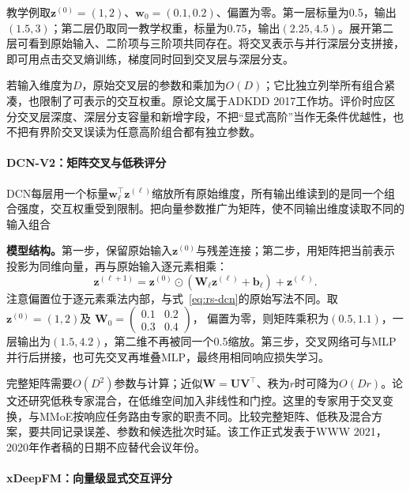 教学例取$\bm z^{(0)}=(1,2)$、$\bm w_0=(0.1,0.2)$、偏置为零。第一层标量为0.5，输出$(1.5,3)$；第二层仍取同一教学权重，标量为0.75，输出$(2.25,4.5)$。展开第二层可看到原始输入、二阶项与三阶项共同存在。将交叉表示与并行深层分支拼接，即可用点击交叉熵训练，梯度同时回到交叉层与深层分支。

若输入维度为$D$，原始交叉层的参数和乘加为$O(D)$；它比独立列举所有组合紧凑，也限制了可表示的交互权重。原论文属于ADKDD 2017工作坊。评价时应区分交叉层深度、深层分支容量和新增字段，不把“显式高阶”当作无条件优越性，也不把有界阶交叉误读为任意高阶组合都有独立参数。

\paragraph{DCN-V2：矩阵交叉与低秩评分}
\label{sec:rs-dcn-v2}

DCN每层用一个标量$\bm w_\ell^\top\bm z^{(\ell)}$缩放所有原始维度，所有输出维读到的是同一个组合强度，交互权重受到限制。把向量参数推广为矩阵，使不同输出维度读取不同的输入组合

\textbf{模型结构。}第一步，保留原始输入$\bm z^{(0)}$与残差连接；第二步，用矩阵把当前表示投影为同维向量，再与原始输入逐元素相乘：
\begin{equation}
 \bm z^{(\ell+1)}
 =\bm z^{(0)}\odot(\bm W_\ell\bm z^{(\ell)}+\bm b_\ell)
  +\bm z^{(\ell)}.
 \label{eq:rs-dcn-v2}
\end{equation}
注意偏置位于逐元素乘法内部，与式~\eqref{eq:rs-dcn}的原始写法不同。取$\bm z^{(0)}=(1,2)$及
$\bm W_0=\left(\begin{smallmatrix}0.1&0.2\\0.3&0.4\end{smallmatrix}\right)$，
偏置为零，则矩阵乘积为$(0.5,1.1)$，一层输出为$(1.5,4.2)$，第二维不再被同一个0.5缩放。第三步，交叉网络可与MLP并行后拼接，也可先交叉再堆叠MLP，最终用相同响应损失学习。

完整矩阵需要$O(D^2)$参数与计算；近似$\bm W=\bm U\bm V^\top$、秩为$r$时可降为$O(Dr)$。论文还研究低秩专家混合，在低维空间加入非线性和门控。这里的专家用于交叉变换，与MMoE按响应任务路由专家的职责不同。比较完整矩阵、低秩及混合方案，要共同记录误差、参数和候选批次时延。该工作正式发表于WWW 2021，2020年作者稿的日期不应替代会议年份。

\paragraph{xDeepFM：向量级显式交互评分}
\label{sec:rs-xdeepfm}

